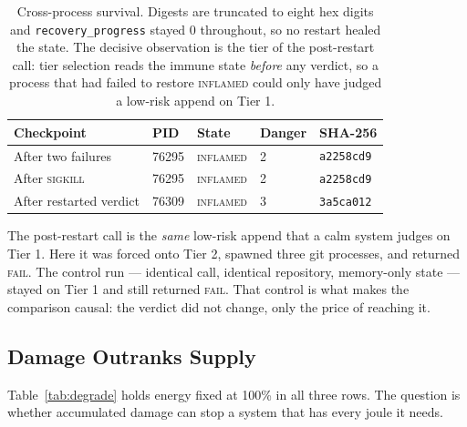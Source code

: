 \documentclass[conference]{IEEEtran}
\begin{document}
\begin{table}[t]
  \centering
  \caption{Cross-process survival. Digests are truncated to eight hex digits and
  \texttt{recovery\_progress} stayed $0$ throughout, so no restart healed the
  state. The decisive
  observation is the tier of the post-restart call: tier selection reads the
  immune state \emph{before} any verdict, so a process that had failed to restore
  \textsc{inflamed} could only have judged a low-risk append on Tier 1.}
  \label{tab:persist}
  \renewcommand{\arraystretch}{1.12}
  \setlength{\tabcolsep}{3pt}
  \begin{tabular}{@{}L{0.26\columnwidth}C{0.11\columnwidth}L{0.18\columnwidth}C{0.13\columnwidth}L{0.19\columnwidth}@{}}
    \toprule
    \textbf{Checkpoint} & \textbf{PID} & \textbf{State} & \textbf{Danger} &
    \textbf{SHA-256} \\
    \midrule
    After two failures      & 76295 & \textsc{inflamed} & 2 & \texttt{a2258cd9} \\
    After \textsc{sigkill}  & 76295 & \textsc{inflamed} & 2 & \texttt{a2258cd9} \\
    After restarted verdict & 76309 & \textsc{inflamed} & 3 & \texttt{3a5ca012} \\
    \bottomrule
  \end{tabular}
\end{table}

The post-restart call is the \emph{same} low-risk append that a calm system
judges on Tier 1. Here it was forced onto Tier 2, spawned three git processes,
and returned \textsc{fail}. The control run --- identical call, identical
repository, memory-only state --- stayed on Tier 1 and still returned
\textsc{fail}. That control is what makes the comparison causal: the verdict did
not change, only the price of reaching it.

\subsection{Damage Outranks Supply}
\label{sec:res-pain}

Table~\ref{tab:degrade} holds energy fixed at 100\% in all three rows. The
question is whether accumulated damage can stop a system that has every joule it
needs.
\end{document}
